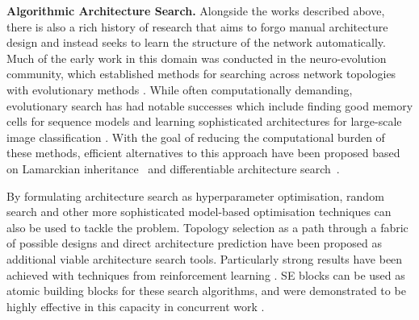 \vspace{5pt}
\noindent\textbf{Algorithmic Architecture Search.} Alongside the works described above, there is also a rich history of research that aims to forgo manual architecture design and instead seeks to learn the structure of the network automatically.  Much of the early work in this domain was conducted in the neuro-evolution community, which established methods for searching across network topologies with evolutionary methods \cite{miller_1989,stanley_2002}. While often computationally demanding, evolutionary search has had notable successes which include finding good memory cells for sequence models \cite{bayer_icann2009,jozefowicz_icml2015} and learning sophisticated architectures for large-scale image classification \cite{xie_iccv2017,real_icml2017,real_2018a}.  With the goal of reducing the computational burden of these methods, efficient alternatives to this approach have been proposed based on Lamarckian inheritance~\cite{elsken_2018mul} and differentiable architecture search~\cite{liu_2018darts}.

By formulating architecture search as hyperparameter optimisation, random search \cite{bergstra_jmlr2012} and other more sophisticated model-based optimisation techniques \cite{liu_eccv2018progressive,negrinho_2017deeparchitect} can also be used to tackle the problem.  Topology selection as a path through a fabric of possible designs \cite{saxena_nips2016} and direct architecture prediction \cite{brock_iclr2018,baker_iclrw2018} have been proposed as additional viable architecture search tools. Particularly strong results have been achieved with techniques from reinforcement learning \cite{baker_iclr2017,zoph_iclr2017,zoph_cvpr2018,liu_iclr2018deepmind,pham_icml2018}.  SE blocks can be used as atomic building blocks for these search algorithms, and were demonstrated to be highly effective in this capacity in concurrent work \cite{tan_2018mnasnet}.


